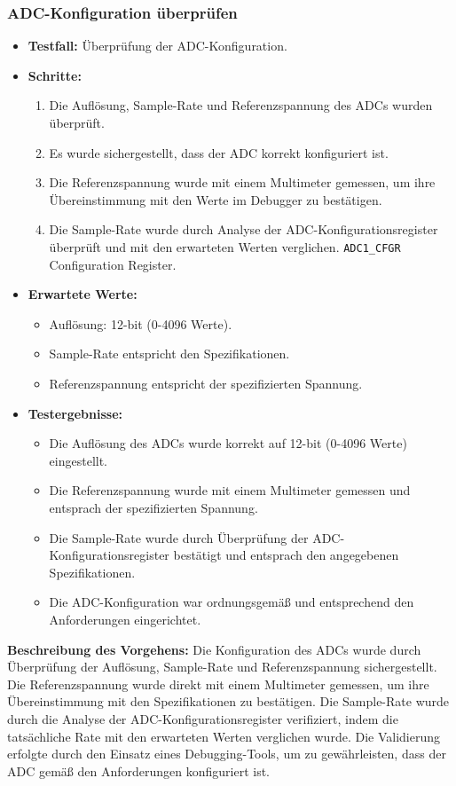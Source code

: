 \subsubsection{ADC-Konfiguration überprüfen}
\begin{itemize}
    \item \textbf{Testfall:} Überprüfung der ADC-Konfiguration.
    \item \textbf{Schritte:}
    \begin{enumerate}
        \item Die Auflösung, Sample-Rate und Referenzspannung des ADCs wurden überprüft.
        \item Es wurde sichergestellt, dass der ADC korrekt konfiguriert ist.
        \item Die Referenzspannung wurde mit einem Multimeter gemessen, um ihre Übereinstimmung mit den Werte im Debugger zu bestätigen.
        \item Die Sample-Rate wurde durch Analyse der ADC-Konfigurationsregister überprüft und mit den erwarteten Werten verglichen. \texttt{ADC1\_CFGR} Configuration Register.
    \end{enumerate}
    \item \textbf{Erwartete Werte:}
    \begin{itemize}
        \item Auflösung: 12-bit (0-4096 Werte).
        \item Sample-Rate entspricht den Spezifikationen.
        \item Referenzspannung entspricht der spezifizierten Spannung.
    \end{itemize}
    \item \textbf{Testergebnisse:}
    \begin{itemize}
        \item Die Auflösung des ADCs wurde korrekt auf 12-bit (0-4096 Werte) eingestellt.
        \item Die Referenzspannung wurde mit einem Multimeter gemessen und entsprach der spezifizierten Spannung.
        \item Die Sample-Rate wurde durch Überprüfung der ADC-Konfigurationsregister bestätigt und entsprach den angegebenen Spezifikationen.
        \item Die ADC-Konfiguration war ordnungsgemäß und entsprechend den Anforderungen eingerichtet.
    \end{itemize}
\end{itemize}

\textbf{Beschreibung des Vorgehens:}
Die Konfiguration des ADCs wurde durch Überprüfung der Auflösung, Sample-Rate und Referenzspannung sichergestellt. Die Referenzspannung wurde direkt mit einem Multimeter gemessen, um ihre Übereinstimmung mit den Spezifikationen zu bestätigen. Die Sample-Rate wurde durch die Analyse der ADC-Konfigurationsregister verifiziert, indem die tatsächliche Rate mit den erwarteten Werten verglichen wurde. Die Validierung erfolgte durch den Einsatz eines Debugging-Tools, um zu gewährleisten, dass der ADC gemäß den Anforderungen konfiguriert ist.


